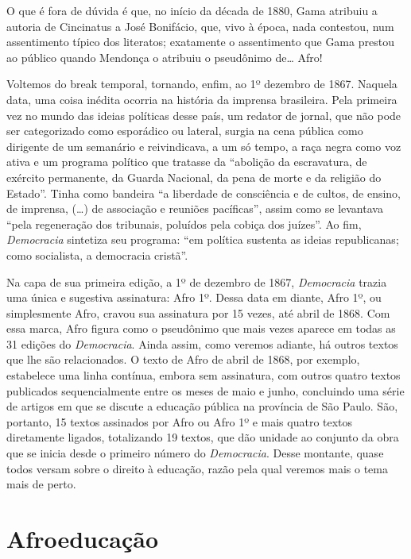 O que é fora de dúvida é que, no início da década de 1880, Gama atribuiu
a autoria de Cincinatus a José Bonifácio, que, vivo à época, nada
contestou, num assentimento típico dos literatos; exatamente o
assentimento que Gama prestou ao público quando Mendonça o atribuiu o
pseudônimo de\ldots{} Afro!

Voltemos do break temporal, tornando, enfim, ao 1º dezembro de 1867.
Naquela data, uma coisa inédita ocorria na história da imprensa
brasileira. Pela primeira vez no mundo das ideias políticas desse país,
um redator de jornal, que não pode ser categorizado como esporádico ou
lateral, surgia na cena pública como dirigente de um semanário e
reivindicava, a um só tempo, a raça negra como voz ativa e um programa
político que tratasse da ``abolição da escravatura, de exército
permanente, da Guarda Nacional, da pena de morte e da religião do
Estado''. Tinha como bandeira ``a liberdade de consciência e de cultos, de
ensino, de imprensa, (\ldots{}) de associação e reuniões pacíficas'', assim
como se levantava ``pela regeneração dos tribunais, poluídos pela
cobiça dos juízes''. Ao fim, \emph{Democracia} sintetiza seu programa:
``em política sustenta as ideias republicanas; como socialista, a
democracia cristã''.

Na capa de sua primeira edição, a 1º de dezembro de 1867,
\emph{Democracia} trazia uma única e sugestiva assinatura: Afro 1º. Dessa data em diante, Afro 1º, ou simplesmente Afro,
cravou sua assinatura por 15 vezes, até abril de 1868. Com essa marca,
Afro figura como o pseudônimo que mais vezes aparece em todas as
31 edições do \emph{Democracia}. Ainda assim, como veremos adiante, há
outros textos que lhe são relacionados. O texto de Afro de abril
de 1868, por exemplo, estabelece uma linha contínua, embora sem
assinatura, com outros quatro textos publicados sequencialmente entre os
meses de maio e junho, concluindo uma série de artigos em que se discute
a educação pública na província de São Paulo. São, portanto, 15 textos
assinados por Afro ou Afro 1º e mais quatro textos
diretamente ligados, totalizando 19 textos, que dão unidade ao conjunto
da obra que se inicia desde o primeiro número do \emph{Democracia}.
Desse montante, quase todos versam sobre o direito à educação, razão
pela qual veremos mais o tema mais de perto.

\section{Afroeducação}


